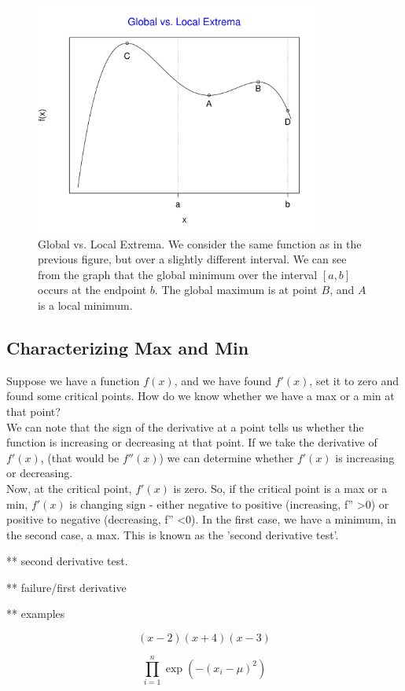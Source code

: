 \documentclass[12pt,a4paper]{article} %
\begin{document}
\begin{figure}[H]
\includegraphics[height=3in]{Extrema2.pdf}
\caption{Global vs. Local Extrema.  We consider the same function as in the previous figure, but over a slightly different interval.  We can see from the graph that the global minimum over the interval $[a,b]$ occurs at the endpoint $b$.  The global maximum is at point $B$, and $A$ is a local minimum.}
\end{figure} 
\subsection{Characterizing Max and Min}
Suppose we have a function $f(x)$, and we have found $f'(x)$, set it to zero and found some critical points. How do we know whether we have a max or a min at that point? \\

We can note that the sign of the derivative at a point tells us whether the function is increasing or decreasing at that point. If we take the derivative of $f'(x)$, (that would be $f''(x)$) we can determine whether $f'(x)$ is increasing or decreasing. \\

Now, at the critical point, $f'(x)$ is zero. So, if the critical point is a max or a min, $f'(x)$ is changing sign - either negative to positive (increasing, f'' >0) or positive to negative (decreasing, f'' <0). In the first case, we have a minimum, in the second case, a max. This is known as the 'second derivative test'.

** second derivative test.

** failure/first derivative

** examples

$$(x-2)(x+4)(x-3)$$

$$\prod\limits_{i=1}^n \exp\left(-\left(x_i-\mu\right)^2\right)$$
\end{document}
